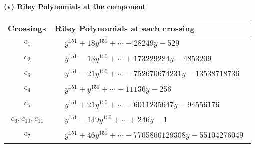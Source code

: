 \documentclass[1p]{elsarticle_modified}
\theoremstyle{definition}
\begin{document}
\newpage\renewcommand{\arraystretch}{1}
\flushleft \textbf{(v) Riley Polynomials at the component}\newline \\
\begin{tabular}{m{50pt}|m{274pt}}
Crossings & \hspace{64pt}Riley Polynomials at each crossing \\
\hline $$\begin{aligned}c_{1}\end{aligned}$$&$\begin{aligned}
&y^{151}+18 y^{150}+\cdots-28249 y-529
\end{aligned}$\\
\hline $$\begin{aligned}c_{2}\end{aligned}$$&$\begin{aligned}
&y^{151}-13 y^{150}+\cdots+173229284 y-4853209
\end{aligned}$\\
\hline $$\begin{aligned}c_{3}\end{aligned}$$&$\begin{aligned}
&y^{151}-21 y^{150}+\cdots-752670674231 y-13538718736
\end{aligned}$\\
\hline $$\begin{aligned}c_{4}\end{aligned}$$&$\begin{aligned}
&y^{151}+y^{150}+\cdots-11136 y-256
\end{aligned}$\\
\hline $$\begin{aligned}c_{5}\end{aligned}$$&$\begin{aligned}
&y^{151}+21 y^{150}+\cdots-6011235647 y-94556176
\end{aligned}$\\
\hline $$\begin{aligned}c_{6},c_{10},c_{11}\end{aligned}$$&$\begin{aligned}
&y^{151}-149 y^{150}+\cdots+246 y-1
\end{aligned}$\\
\hline $$\begin{aligned}c_{7}\end{aligned}$$&$\begin{aligned}
&y^{151}+46 y^{150}+\cdots-7705800129308 y-55104276049
\end{aligned}$\\

\end{tabular}
\end{document}
